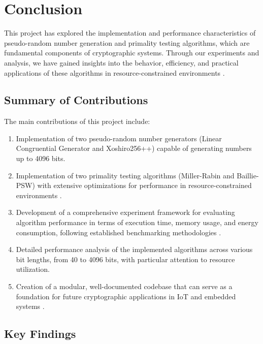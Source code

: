 \section{Conclusion}

This project has explored the implementation and performance characteristics of pseudo-random number generation and primality testing algorithms, which are fundamental components of cryptographic systems. Through our experiments and analysis, we have gained insights into the behavior, efficiency, and practical applications of these algorithms in resource-constrained environments \cite{resource_constrained}.

\subsection{Summary of Contributions}

The main contributions of this project include:

\begin{enumerate}
    \item Implementation of two pseudo-random number generators (Linear Congruential Generator and Xoshiro256++) capable of generating numbers up to 4096 bits.
    
    \item Implementation of two primality testing algorithms (Miller-Rabin and Baillie-PSW) with extensive optimizations for performance in resource-constrained environments \cite{energy_efficient}.
    
    \item Development of a comprehensive experiment framework for evaluating algorithm performance in terms of execution time, memory usage, and energy consumption, following established benchmarking methodologies \cite{embedded_benchmarking}.
    
    \item Detailed performance analysis of the implemented algorithms across various bit lengths, from 40 to 4096 bits, with particular attention to resource utilization.
    
    \item Creation of a modular, well-documented codebase that can serve as a foundation for future cryptographic applications in IoT and embedded systems \cite{iot_survey}.
\end{enumerate}

\subsection{Key Findings}

